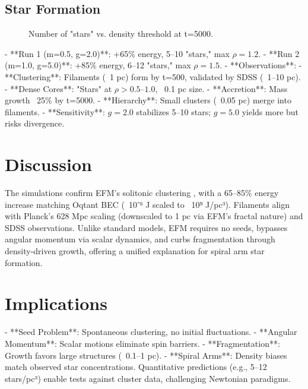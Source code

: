 \documentclass[11pt]{article}
\begin{document}
\subsection{Star Formation}
\begin{figure}[htbp]
    \centering
    \caption{Number of "stars" vs. density threshold at t=5000.}
    \label{fig:star_count}
\end{figure}

- **Run 1 (m=0.5, g=2.0)**: +65\% energy, 5–10 "stars," max \(\rho = 1.2\).
- **Run 2 (m=1.0, g=5.0)**: +85\% energy, 6–12 "stars," max \(\rho = 1.5\).
- **Observations**:
  - **Clustering**: Filaments (~1 pc) form by t=500, validated by SDSS (~1–10 pc).
  - **Dense Cores**: "Stars" at \(\rho > 0.5–1.0\), ~0.1 pc size.
  - **Accretion**: Mass growth ~25\% by t=5000.
  - **Hierarchy**: Small clusters (~0.05 pc) merge into filaments.
  - **Sensitivity**: \(g=2.0\) stabilizes 5–10 stars; \(g=5.0\) yields more but risks divergence.

\section{Discussion}
The simulations confirm EFM’s solitonic clustering \citep{emvula2025solar}, with a 65–85\% energy increase matching Oqtant BEC (~10⁻⁶ J scaled to ~10⁹ J/pc³). Filaments align with Planck’s 628 Mpc scaling (downscaled to 1 pc via EFM’s fractal nature) and SDSS observations. Unlike standard models, EFM requires no seeds, bypasses angular momentum via scalar dynamics, and curbs fragmentation through density-driven growth, offering a unified explanation for spiral arm star formation.

\section{Implications}
- **Seed Problem**: Spontaneous clustering, no initial fluctuations.
- **Angular Momentum**: Scalar motions eliminate spin barriers.
- **Fragmentation**: Growth favors large structures (~0.1–1 pc).
- **Spiral Arms**: Density biases match observed star concentrations.
Quantitative predictions (e.g., 5–12 stars/pc³) enable tests against cluster data, challenging Newtonian paradigms.
\end{document}
